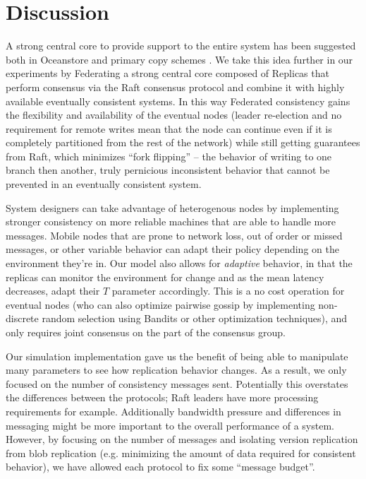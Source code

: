 \documentclass[10pt,conference,letterpaper]{IEEEtran}
\begin{document}
\section{Discussion}

A strong central core to provide support to the entire system has been suggested both in Oceanstore \cite{kubiatowicz_oceanstore:_2000} and primary copy schemes \cite{gray_dangers_1996}. We take this idea further in our experiments by Federating a strong central core composed of Replicas that perform consensus via the Raft consensus protocol and combine it with highly available eventually consistent systems. In this way Federated consistency gains the flexibility and availability of the eventual nodes (leader re-election and no requirement for remote writes mean that the node can continue even if it is completely partitioned from the rest of the network) while still getting guarantees from Raft, which minimizes ``fork flipping'' -- the behavior of writing to one branch then another, truly pernicious inconsistent behavior that cannot be prevented in an eventually consistent system.

System designers can take advantage of heterogenous nodes by implementing stronger consistency on more reliable machines that are able to handle more messages. Mobile nodes that are prone to network loss, out of order or missed messages, or other variable behavior can adapt their policy depending on the environment they're in. Our model also allows for \textit{adaptive} behavior, in that the replicas can monitor the environment for change and as the mean latency decreases, adapt their $T$ parameter accordingly. This is a no cost operation for eventual nodes (who can also optimize pairwise gossip by implementing non-discrete random selection using Bandits or other optimization techniques), and only requires joint consensus on the part of the consensus group.

Our simulation implementation gave us the benefit of being able to manipulate many parameters to see how replication behavior changes. As a result, we only focused on the number of consistency messages sent. Potentially this overstates the differences between the protocols; Raft leaders have more processing requirements for example. Additionally bandwidth pressure and differences in messaging might be more important to the overall performance of a system. However, by focusing on the number of messages and isolating version replication from blob replication (e.g. minimizing the amount of data required for consistent behavior), we have allowed each protocol to fix some ``message budget''.
\end{document}
